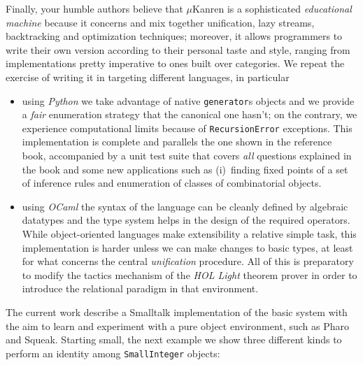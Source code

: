 \documentclass[a4paper,12pt]{article}
\begin{document}
Finally, your humble authors believe that $\mu$Kanren is a sophisticated
\textit{educational machine} because it concerns and mix together unification,
lazy streams, backtracking and optimization techniques; moreover, it allows
programmers to write their own version according to their personal taste and
style, ranging from implementations pretty imperative to ones built over
categories.  We repeat the exercise of writing it in \citep{Nocentini:kanrens}
targeting different languages, in particular
\begin{itemize}
\item using \emph{Python} we take advantage of native \verb|generator|s objects
and we provide a \emph{fair} enumeration strategy that the canonical one
hasn't; on the contrary, we experience computational limits because of
\texttt{RecursionError} exceptions. This implementation is complete and
parallels the one shown in the reference book, accompanied by a unit test suite
that covers \emph{all} questions explained in the book and some new
applications such as (i)~finding fixed points of a set of inference rules and
enumeration of classes of combinatorial objects.
\item using \emph{OCaml} the syntax of the language can be cleanly defined by
algebraic datatypes and the type system helps in the design of the required
operators.  While object-oriented languages make extensibility a relative
simple task, this implementation is harder unless we can make changes to basic
types, at least for what concerns the central \emph{unification} procedure.
All of this is preparatory to modify the tactics mechanism of the \emph{HOL
Light} theorem prover in order to introduce the relational paradigm in that
environment.
\end{itemize}
The current work describe a Smalltalk implementation of the basic system
with the aim to learn and experiment with a pure object environment, such as 
Pharo and Squeak. Starting small, the next example we show three different
kinds to perform an identity among \verb|SmallInteger| objects:
\end{document}

